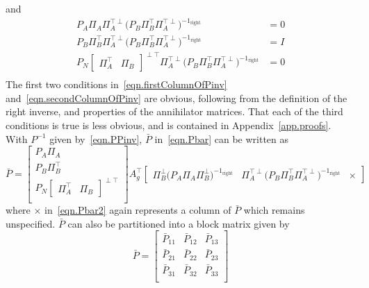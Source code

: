 and
\begin{equation}
  \label{eqn.secondColumnOfPinv}
  \begin{split}
    P_{A}\Pi_{A}\Pi_{A}^{\top\perp}\bigr(P_{B}\Pi_{B}^{\top}\Pi_{A}^{\top\perp}\bigr)^{-1_{\text{right}}}
    &= 0 \\
    P_{B}\Pi_{B}^{\top}\Pi_{A}^{\top\perp}\bigr(P_{B}\Pi_{B}^{\top}\Pi_{A}^{\top\perp}\bigr)^{-1_{\text{right}}}
    &= I \\
    P_{N}
    \begin{bmatrix}
      \Pi_{A}^{\top} & \Pi_{B}
    \end{bmatrix}^{\perp\top}
    \Pi_{A}^{\top\perp}\bigr(P_{B}\Pi_{B}^{\top}\Pi_{A}^{\top\perp}\bigr)^{-1_{\text{right}}}
    &= 0 \\
  \end{split}
\end{equation}
The first two conditions in\ \eqref{eqn.firstColumnOfPinv} and\ \eqref{eqn.secondColumnOfPinv} are obvious, following from the definition of the right inverse, and properties of the annihilator matrices.
That each of the third conditions is true is less obvious, and is contained in Appendix~\ref{app.proofs}.
With $P^{-1}$ given by\ \eqref{eqn.PPinv}, $\bar{P}$ in\ \eqref{eqn.Pbar} can be written as
\begin{equation}
  \label{eqn.Pbar2}
  \bar{P} =
  \begin{bmatrix}
    P_{A}\Pi_{A} \\
    P_{B}\Pi_{B}^{\top} \\
    P_{N}
    \begin{bmatrix}
      \Pi_{A}^{\top} & \Pi_{B}
    \end{bmatrix}^{\perp\top} \\
  \end{bmatrix}
  A_{g}^{\top}
  \begin{bmatrix}
    \Pi_{B}^{\perp}\bigr(P_{A}\Pi_{A}\Pi_{B}^{\perp}\bigr)^{-1_{\text{right}}}
    &
    \Pi_{A}^{\top\perp}\bigr(P_{B}\Pi_{B}^{\top}\Pi_{A}^{\top\perp}\bigr)^{-1_{\text{right}}}
    &
    \times
  \end{bmatrix}
\end{equation}
where $\times$ in\ \eqref{eqn.Pbar2} again represents a column of $\bar{P}$ which remains unspecified.
$\bar{P}$ can also be partitioned into a block matrix given by
\begin{equation}
  \label{eqn.PbarPartitioned}
  \bar{P} =
  \begin{bmatrix}
    \bar{P}_{11} & \bar{P}_{12} & \bar{P}_{13} \\
    \bar{P}_{21} & \bar{P}_{22} & \bar{P}_{23}\\
    \bar{P}_{31} & \bar{P}_{32} & \bar{P}_{33}\\
  \end{bmatrix}
\end{equation}
